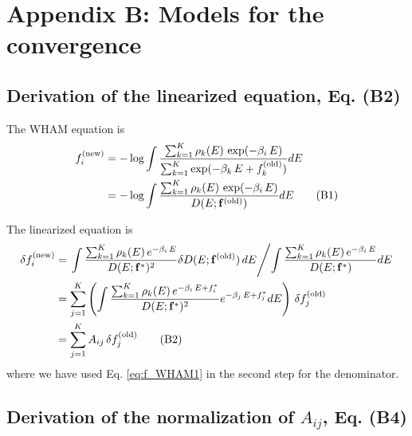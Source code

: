 \documentclass[aip,jcp,preprint,notitlepage, superscriptaddress]{revtex4-1}
\begin{document}
\section{Appendix B: Models for the convergence}







\subsection{Derivation of the linearized equation, Eq. (B2)}



The WHAM equation is
%
\begin{align}
f_i^\mathrm{(new)}
&=
-\log
\int
\frac
{
  \sum_{k=1}^K \rho_k(E) \, \exp(-\beta_i \, E)
}
{
  \sum_{k=1}^K
  \exp(
    -\beta_k \, E + f_k^\mathrm{(old)}
  )
}
dE
\notag \\
&=
-\log
\int
\frac
{
  \sum_{k=1}^K \rho_k(E) \, \exp(-\beta_i \, E)
}
{
  D(E; \mathbf{f}^\mathrm{(old)})
}
dE
\tag{B1}
\label{eq:f_WHAM1}
\end{align}



The linearized equation is
\begin{align}
\delta f_i^\mathrm{(new)}
&=
\left.
  \int
  \frac
  {
    \sum_{k=1}^K \rho_k(E) \, e^{-\beta_i \, E}
  }
  {
    D(E; \vct f^*)^2
  }
  \delta D(E; \vct f^\mathrm{(old)}) \,
  dE
\middle/
  \int
  \frac
  {
    \sum_{k=1}^K \rho_k(E) \, e^{-\beta_i \, E}
  }
  {
    D(E; \vct f^*)
  }
  dE
\right.
%
\notag \\
&=
\sum_{j = 1}^K
\left(
\int
\frac
{
  \sum_{k=1}^K \rho_k(E) \, e^{-\beta_i \, E + f_i^*}
}
{
  D(E; \vct f^*)^2
}
e^{-\beta_j \, E + f_j^*}
dE
\right)
\, \delta f_j^\mathrm{(old)}
\notag \\
&=
\sum_{j = 1}^K
A_{ij} \, \delta f_j^\mathrm{(old)}
\tag{B2}
\label{eq:f_lin}
\end{align}
where we have used
Eq. \eqref{eq:f_WHAM1}
in the second step
for the denominator.





\subsection{Derivation of the normalization of $A_{ij}$, Eq. (B4)}
\end{document}
